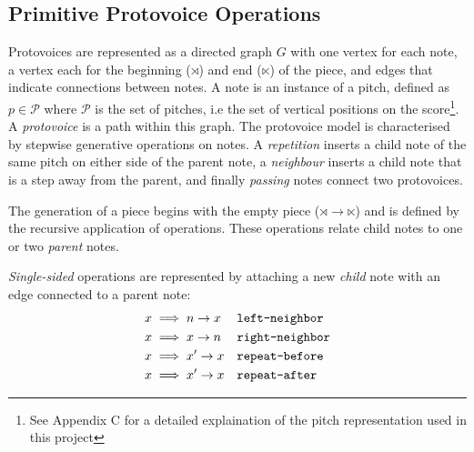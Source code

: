 \documentclass[12pt,a4paper,twoside,openright]{report}
\theoremstyle{definition}
\begin{document}
\subsection{Primitive Protovoice Operations} %
\label{sub:Inner Structure}


Protovoices are represented as a directed graph $G$ with one vertex for each note, a vertex each for the beginning ($\rtimes$) and end ($\ltimes$) of the piece, and edges that indicate connections between notes.
A note is an instance of a pitch, defined as $p \in \mathcal{P}$ where $\mathcal{P}$ is the set of pitches, i.e the set of vertical positions on the score\footnote{See Appendix C for a detailed explaination of the pitch representation used in this project}. 
A \textit{protovoice} is a path within this graph.
The protovoice model is characterised by stepwise generative operations on notes. A \textit{repetition} inserts a child note of the same pitch on either side of the parent note, a \textit{neighbour} inserts a child note that is a step away from the parent, and finally \textit{passing} notes connect two protovoices.

The generation of a piece begins with the empty piece ($\rtimes \to \ltimes$) and is defined by the recursive application of operations. 
These operations relate child notes to one or two \textit{parent} notes.


\textit{Single-sided} operations are represented by attaching a new \textit{child} note with an edge connected to a parent note: 
\begin{equation}
  \begin{aligned}
    x &\implies n \to x && \text{\texttt{left-neighbor}}
  \label{eq:leftNeighbor} \\
    x &\implies x \to n && \text{\texttt{right-neighbor}}
  \label{eq:rightNeighbor} \\
    x &\implies x' \to x && \text{\texttt{repeat-before}}
  \label{eq:repeatBefore} \\
    x &\implies x' \to x && \text{\texttt{repeat-after}}
  \label{eq:repeatAfter} \\
  \end{aligned}
\end{equation}
\end{document}
